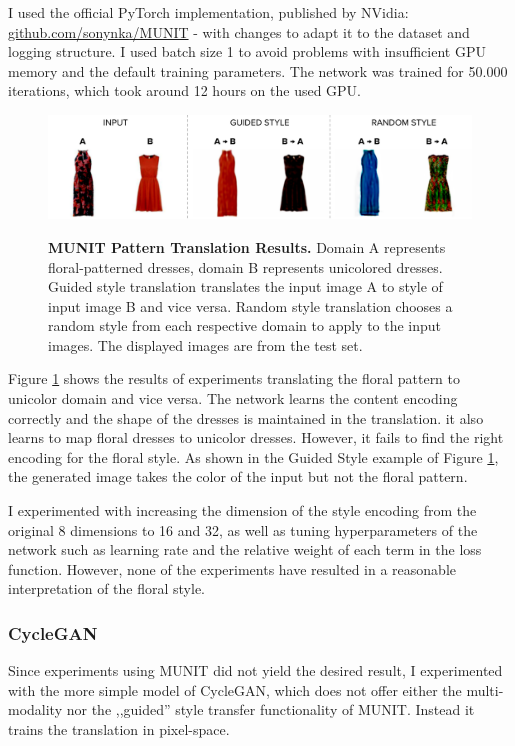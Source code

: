 \documentclass[12pt]{report}
\begin{document}
I used the official PyTorch implementation, published by NVidia: \linebreak\hyperlink{https://github.com/sonynka/MUNIT}{github.com/sonynka/MUNIT} - with changes to adapt it to the dataset and logging structure. I used batch size 1 to avoid problems with insufficient GPU memory and the default training parameters. The network was trained for 50.000 iterations, which took around 12 hours on the used GPU.

\begin{figure}[h]
\centering
{\includegraphics[width=\linewidth]{04_experiments/munit/munit_results}}
\caption{\label{fig:munit_results} \textbf{MUNIT Pattern Translation Results.} Domain A represents floral-patterned dresses, domain B represents unicolored dresses. Guided style translation translates the input image A to style of input image B and vice versa. Random style translation chooses a random style from each respective domain to apply to the input images. The displayed images are from the test set.}
\end{figure}

Figure \ref{fig:munit_results} shows the results of experiments translating the floral pattern to unicolor domain and vice versa. The network learns the content encoding correctly and the shape of the dresses is maintained in the translation. it also learns to map floral dresses to unicolor dresses. However, it fails to find the right encoding for the floral style. As shown in the Guided Style example of Figure \ref{fig:munit_results}, the generated image takes the color of the input but not the floral pattern.

I experimented with increasing the dimension of the style encoding from the original 8 dimensions to 16 and 32, as well as tuning hyperparameters of the network such as learning rate and the relative weight of each term in the loss function. However, none of the experiments have resulted in a reasonable interpretation of the floral style.

\subsubsection{CycleGAN}
Since experiments using MUNIT did not yield the desired result, I experimented with the more simple model of CycleGAN, which does not offer either the multi-modality nor the ,,guided'' style transfer functionality of MUNIT. Instead it trains the translation in pixel-space.
\end{document}
